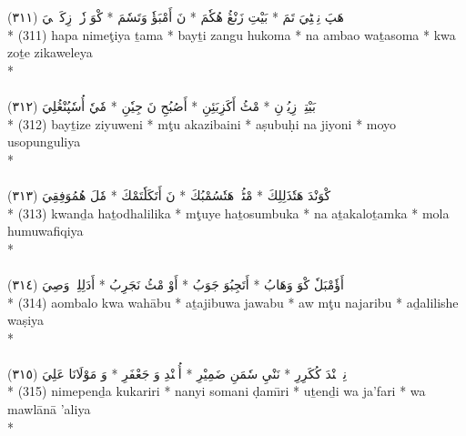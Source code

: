 \documentclass[a4paper, 12pt]{report}
\begin{document}
\begin{center}
\textarabic{(٣١١) \textcolor{mygreen}{هَپَ نِمٖٹِيَ تَمَ  * بَيْتِ زَنْڠُ هُكٗمَ  * نَ أَمْبَؤٗ وَتَسٗمَ  * كْوَ زٗتٖ زِكَوٖلٖيَ }} \\* 
(311) hapa nimeţiya ṯama  * bayṯi zangu hukoma  * na ambao waṯasoma  * kwa zoṯe zikaweleya  \\* 
 \\ 
\\[8mm] 

\textarabic{(٣١٢) \textcolor{mygreen}{بَيْتِزٖ زِيُوٖنِ  * مْٹُ أَكَزِبَئِنِ  * أَصُبُحِ نَ جِيٗنِ  * مٗيٗ أُسٗپُنْڠُلِيَ }} \\* 
(312) bayṯize ziyuweni  * mţu akazibaini  * aṣubuḥi na jiyoni  * moyo usopunguliya  \\* 
 \\ 
\\[8mm] 

\textarabic{(٣١٣) \textcolor{mygreen}{كْوَنْدَ هَتٗذَلِلِكَ  * مْٹُيٖ هَتٗسُمْبُكَ  * نَ أَتَكَلٗتَمْكَ  * مٗلَ هُمُوَفِقِيَ }} \\* 
(313) kwanḏa haṯodhalilika  * mţuye haṯosumbuka  * na aṯakaloṯamka  * mola humuwafiqiya  \\* 
 \\ 
\\[8mm] 

\textarabic{(٣١٤) \textcolor{mygreen}{أَؤٗمْبَلٗ كْوَ وَهَابُ  * أَتَجِبُوَ جَوَبُ  * أَوْ مْٹُ نَجَرِبُ  * أَدَلِلِشٖ وَصِيَ }} \\* 
(314) aombalo kwa wahābu  * aṯajibuwa jawabu  * aw mţu najaribu  * aḏalilishe waṣiya  \\* 
 \\ 
\\[8mm] 

\textarabic{(٣١٥) \textcolor{mygreen}{نِمٖپٖنْدَ كُكَرِرِ  * نَنْيِ سٗمَنِ ضَمِيْرِ  * أُتٖنْدِ وَ جَعْفَرِ  * وَ مَوْلَانَا عَلِيَ }} \\* 
(315) nimepenḏa kukariri  * nanyi somani ḍamı̄ri  * uṯenḏi wa ja'fari  * wa mawlānā 'aliya  \\* 
 \\ 
\\[8mm] 

\end{center} 

\renewcommand{\bibname}{References} 
\begingroup 
\printbibliography 
\endgroup 
\end{document}
